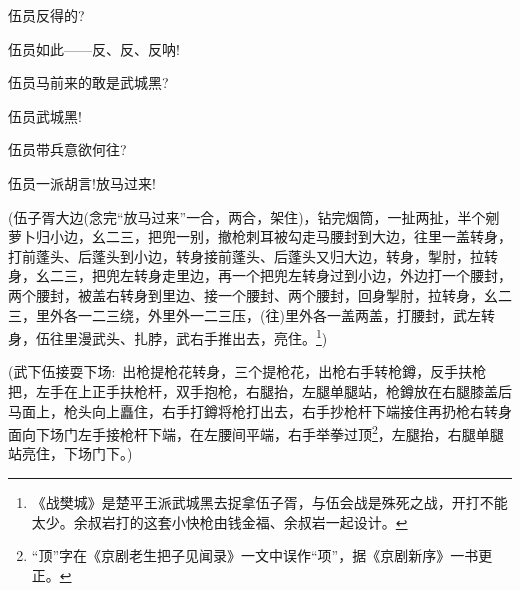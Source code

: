 {伍员\hspace{30pt}反得的?

伍员\hspace{30pt}如此------反、反、反呐!




\vspace{5pt}

伍员\hspace{30pt}马前来的敢是武城黑?

伍员\hspace{30pt}武城黑!

伍员\hspace{30pt}带兵意欲何往?

伍员\hspace{30pt}一派胡言!放马过来!

(伍子胥{\hwfs 大边}({\hwfs 念完}``{放马过来}''{\hwfs 一合}，{\hwfs 两合}，{\hwfs 架住})，{\hwl 钻完烟筒}，{\hwl 一扯两扯}，{\hwl 半个剜萝卜归小边}，{\hwl 幺二三}，{\hwl 把兜一别}，{\hwl 撤枪刺耳被勾走马腰封到大边}，{\hwl 往里一盖转身}，{\hwl 打前蓬头}、{\hwl 后蓬头到小边}，{\hwl 转身接前蓬头}、{\hwl 后蓬头又归大边}，{\hwl 转身}，{\hwl 掣肘}，{\hwl 拉转身}，{\hwl 幺二三}，{\hwl 把兜左转身走里边}，{\hwl 再一个把兜左转身过到小边}，{\hwl 外边打一个腰封}，{\hwl 两个腰封}，{\hwl 被盖右转身到里边}、{\hwl 接一个腰封}、{\hwl 两个腰封}，{\hwl 回身掣肘}，{\hwl 拉转身}，{\hwl 幺二三}，{\hwl 里外各一二三绕}，{\hwl 外里外一二三压}，({\hwl 往}){\hwl 里外各一盖两盖}，{\hwl 打腰封}，武{\hwl 左转身}，伍{\hwl 往里漫}武{\hwl 头}、{\hwl 扎脖}，武{\hwl 右手推出去}，{\hwl 亮住}。\footnote{ {《战樊城》是楚平王派武城黑去捉拿伍子胥}，{与伍会战是殊死之战}，{开打不能太少}。{余叔岩打的这套小快枪由钱金福、余叔岩一起设计。}})

(武{\hwfs 下}伍{\hwfs 接耍下场}:~{\hwl 出枪提枪花转身}，{\hwl 三个提枪花}，{\hwl 出枪右手转枪鐏}，{\hwl 反手扶枪把}，{\hwl 左手在上正手扶枪杆}，{\hwl 双手抱枪}，{\hwl 右腿抬}，{\hwl 左腿单腿站}，{\hwl 枪鐏放在右腿膝盖后马面上}，{\hwl 枪头向上矗住}，{\hwl 右手打鐏将枪打出去}，{\hwl 右手抄枪杆下端接住再扔枪右转身面向下场门左手接枪杆下端}，{\hwl 在左腰间平端}，{\hwl 右手举拳过顶}\footnote{ ``顶''字在《京剧老生把子见闻录》一文中误作``项''，据《京剧新序》一书更正。}，{\hwl 左腿抬}，{\hwl 右腿单腿站亮住}，{\hwfs 下场门下}。)

}
